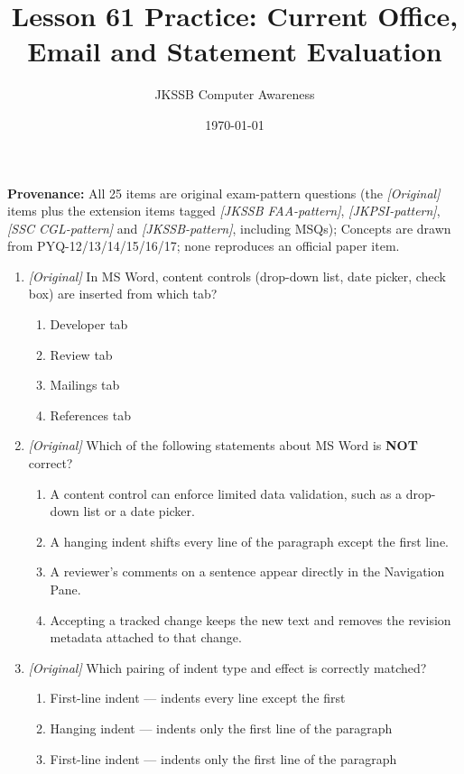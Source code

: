 \documentclass[11pt]{article}
\title{Lesson 61 Practice: Current Office, Email and Statement Evaluation}
\author{JKSSB Computer Awareness}
\date{\today}
\begin{document}
\maketitle
\noindent\textbf{Provenance:} All 25 items are original exam-pattern questions (the \textit{[Original]} items plus the extension items tagged \textit{[JKSSB FAA-pattern]}, \textit{[JKPSI-pattern]}, \textit{[SSC CGL-pattern]} and \textit{[JKSSB-pattern]}, including MSQs); Concepts are drawn from PYQ-12/13/14/15/16/17; none reproduces an official paper item.


\begin{enumerate}[label=\textbf{Q\arabic*.}, leftmargin=*]
\item \textit{[Original]} In MS Word, content controls (drop-down list, date
  picker, check box) are inserted from which tab?
  \begin{enumerate}[label=\Alph*.]
    \item Developer tab
    \item Review tab
    \item Mailings tab
    \item References tab
  \end{enumerate}
\item \textit{[Original]} Which of the following statements about MS Word is
  \textbf{NOT} correct?
  \begin{enumerate}[label=\Alph*.]
    \item A content control can enforce limited data validation, such as a
      drop-down list or a date picker.
    \item A hanging indent shifts every line of the paragraph except the first
      line.
    \item A reviewer's comments on a sentence appear directly in the Navigation
      Pane.
    \item Accepting a tracked change keeps the new text and removes the
      revision metadata attached to that change.
  \end{enumerate}
\item \textit{[Original]} Which pairing of indent type and effect is correctly
  matched?
  \begin{enumerate}[label=\Alph*.]
    \item First-line indent --- indents every line except the first
    \item Hanging indent --- indents only the first line of the paragraph
    \item First-line indent --- indents only the first line of the paragraph

\end{enumerate}
\end{enumerate}
\end{document}
